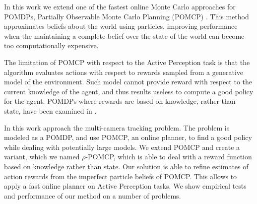 In this work we extend one of the fastest online Monte Carlo approaches for POMDPs, Partially
Observable Monte Carlo Planning (POMCP) \cite{cit:pomcp}. This method approximates beliefs about the
world using particles, improving performance when the maintaining a complete belief over the state
of the world can become too computationally expensive.

The limitation of POMCP with respect to the Active Perception task is that the algorithm evaluates
actions with respect to rewards sampled from a generative model of the environment. Such model
cannot provide reward with respect to the current knowledge of the agent, and thus results useless
to compute a good policy for the agent. POMDPs where rewards are based on knowledge, rather than
state, have been examined in \cite{cit:rpomdp}. 

In this work approach the multi-camera tracking problem. The problem is modeled as a POMDP, and use
POMCP, an online planner, to find a good policy while dealing with potentially large models. We
extend POMCP and create a variant, which we named $\rho$-POMCP, which is able to deal with a reward
function based on knowledge rather than state. Our solution is able to refine estimates of action
rewards from the imperfect particle beliefs of POMCP. This allows to apply a fast online planner on
Active Perception tasks. We show empirical tests and performance of our method on a number of
problems.
